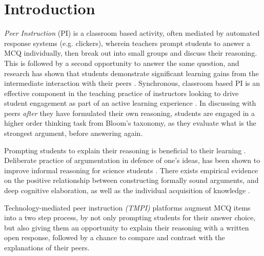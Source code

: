 \documentclass[notitlepage,12pt]{jedm}
\begin{document}
\section{Introduction}\label{sec:intro}

\textit{Peer Instruction} (PI) is a classroom based activity, often mediated by 
automated response systems (e.g. clickers), wherein teachers prompt students to 
answer a MCQ individually, then break out into small 
groups and discuss their reasoning.
This is followed by a second opportunity to answer the same question, and 
research has shown that students demonstrate significant learning gains from 
the intermediate interaction with their peers \cite{crouch_peer_2001}.
Synchronous, classroom based PI is an effective component in the teaching 
practice of instructors looking to drive student engagement as part of an 
active learning experience \cite{charles_beyond_2015}. 
In discussing with peers \textit{after} they have formulated their own 
reasoning, students are engaged in a higher order thinking task from Bloom's 
taxonomy, as they evaluate what is the strongest argument, before answering 
again.

Prompting students to explain their reasoning is beneficial to their learning 
\cite{chi_eliciting_1994}. 
Deliberate practice of argumentation in defence of one's ideas, has been shown 
to improve informal reasoning for science students \cite{venville_impact_2010}.
There exists empirical evidence on the positive relationship between 
constructing formally sound arguments, and deep cognitive elaboration, as well 
as the individual acquisition of knowledge \cite{stegmann_collaborative_2012}.

Technology-mediated peer instruction \textit{(TMPI)} platforms 
\cite{charles_harnessing_2019,university_of_british_columbia_ubc/ubcpi_2019}
augment MCQ items into a two step process, by not only prompting students for 
their answer choice, but also giving them an opportunity to explain their 
reasoning with a written open response, followed by a chance to compare and 
contrast with the explanations of their peers.
\end{document}
